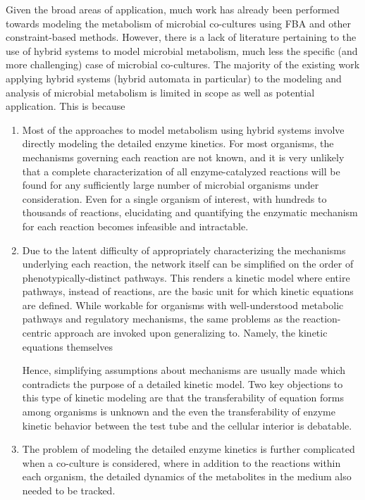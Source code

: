 Given the broad areas of application, much work has already been performed towards modeling the metabolism of microbial co-cultures using FBA and other constraint-based methods. However, there is a lack of literature pertaining to the use of hybrid systems to model microbial metabolism, much less the specific (and more challenging) case of microbial co-cultures. The majority of the existing work applying hybrid systems (hybrid automata in particular) to the modeling and analysis of microbial metabolism is limited in scope as well as potential application. This is because 

\begin{enumerate}
    \item Most of the approaches to model metabolism using hybrid systems involve directly modeling the detailed enzyme kinetics. For most organisms, the mechanisms governing each reaction are not known, and it is very unlikely that a complete characterization of all enzyme-catalyzed reactions will be found for any sufficiently large number of microbial organisms under consideration. Even for a single organism of interest, with hundreds to thousands of reactions, elucidating and quantifying the enzymatic mechanism for each reaction becomes infeasible and intractable.
    
    \item Due to the latent difficulty of appropriately characterizing the mechanisms underlying each reaction, the network itself can be simplified on the order of phenotypically-distinct pathways. This renders a kinetic model where entire pathways, instead of reactions, are the basic unit for which kinetic equations are defined. While workable for organisms with well-understood metabolic pathways and regulatory mechanisms, the same problems as the reaction-centric approach are invoked upon generalizing to. Namely, the kinetic equations themselves
    
    Hence, simplifying assumptions about mechanisms are usually made which contradicts the purpose of a detailed kinetic model. Two key objections to this type of kinetic modeling are that the transferability of equation forms among organisms is unknown and the even the transferability of enzyme kinetic behavior between the test tube and the cellular interior is debatable.
    
    
    \item The problem of modeling the detailed enzyme kinetics is further complicated when a co-culture is considered, where in addition to the reactions within each organism, the detailed dynamics of the metabolites in the medium also needed to be tracked. 
\end{enumerate}

